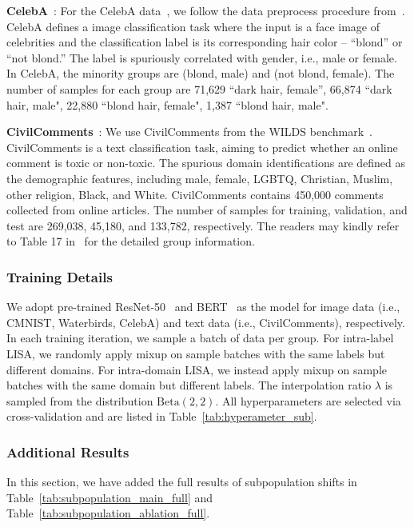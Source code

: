 \textbf{CelebA}~\citep{liu2015faceattributes,sagawa2019distributionally}: 
For the CelebA data~\citep{liu2015faceattributes}, we follow the data preprocess procedure from~\cite{sagawa2019distributionally}.
CelebA defines a image classification task where the input is a face image of celebrities and the classification label is its corresponding hair color --  ``blond” or ``not blond.” The label is spuriously correlated with gender, i.e., male or female. In CelebA, the minority groups are (blond, male) and (not blond, female). The number of samples for each group are 71,629 ``dark hair, female'', 66,874 ``dark hair, male", 22,880 ``blond hair, female", 1,387 ``blond hair, male". 


\textbf{CivilComments}~\citep{borkan2019nuanced,koh2021wilds}: 
We use CivilComments from the WILDS benchmark~\citep{koh2021wilds}. 
CivilComments is a text classification task, aiming to predict whether an online comment is toxic or non-toxic. 
The spurious domain identifications are defined as the demographic features, including male, female, LGBTQ, Christian, Muslim, other religion, Black, and White. 
CivilComments contains 450,000 comments collected from online articles. The number of samples for training, validation, and test are 269,038, 45,180, and 133,782, respectively. The readers may kindly refer to Table 17 in~\cite{koh2021wilds} for the detailed group information. 


\subsubsection{Training Details}
\label{sec:app_sub_training}
We adopt pre-trained ResNet-50~\citep{he2016deep} and BERT~\citep{sanh2019distilbert} as the model for image data (i.e., CMNIST, Waterbirds, CelebA) and text data (i.e., CivilComments), respectively. In each training iteration, we sample a batch of data per group. 
For intra-label LISA, we randomly apply mixup on sample batches with the same labels but different domains. For intra-domain LISA, we instead apply mixup on sample batches with the same domain but different labels. The interpolation ratio $\lambda$ is sampled from the distribution $\mathrm{Beta}(2,2)$. All hyperparameters are selected via cross-validation and are listed in Table~\ref{tab:hyperameter_sub}.

\subsubsection{Additional Results}
In this section, we have added the full results of subpopulation shifts in Table~\ref{tab:subpopulation_main_full} and Table~\ref{tab:subpopulation_ablation_full}.

